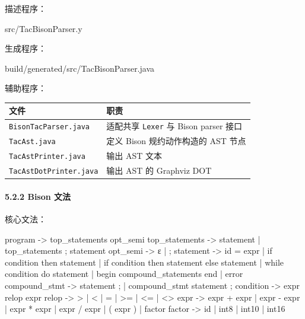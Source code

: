 \documentclass[
  a4paper,
  fontset=none,
]{ctexart}
\newenvironment{Shaded}{}{}
\newcommand{\NormalTok}[1]{#1}
\begin{document}
描述程序：

\begin{Shaded}
\begin{Highlighting}[]
\NormalTok{src/TacBisonParser.y}
\end{Highlighting}
\end{Shaded}

生成程序：

\begin{Shaded}
\begin{Highlighting}[]
\NormalTok{build/generated/src/TacBisonParser.java}
\end{Highlighting}
\end{Shaded}

辅助程序：

\begin{longtable}[]{@{}ll@{}}
\toprule\noalign{}
文件 & 职责 \\
\midrule\noalign{}
\endhead
\bottomrule\noalign{}
\endlastfoot
\texttt{BisonTacParser.java} & 适配共享 \texttt{Lexer} 与 Bison parser
接口 \\
\texttt{TacAst.java} & 定义 Bison 规约动作构造的 AST 节点 \\
\texttt{TacAstPrinter.java} & 输出 AST 文本 \\
\texttt{TacAstDotPrinter.java} & 输出 AST 的 Graphviz DOT \\
\end{longtable}

\hypertarget{bison-ux6587ux6cd5}{%
\paragraph{5.2.2 Bison 文法}\label{bison-ux6587ux6cd5}}

核心文法：

\begin{Shaded}
\begin{Highlighting}[]
\NormalTok{program          {-}\textgreater{} top\_statements opt\_semi}
\NormalTok{top\_statements   {-}\textgreater{} statement}
\NormalTok{                  | top\_statements ; statement}
\NormalTok{opt\_semi         {-}\textgreater{} ε | ;}
\NormalTok{statement        {-}\textgreater{} id = expr}
\NormalTok{                  | if condition then statement}
\NormalTok{                  | if condition then statement else statement}
\NormalTok{                  | while condition do statement}
\NormalTok{                  | begin compound\_statements end}
\NormalTok{                  | error}
\NormalTok{compound\_stmt    {-}\textgreater{} statement ;}
\NormalTok{                  | compound\_stmt statement ;}
\NormalTok{condition        {-}\textgreater{} expr relop expr}
\NormalTok{relop            {-}\textgreater{} \textgreater{} | \textless{} | = | \textgreater{}= | \textless{}= | \textless{}\textgreater{}}
\NormalTok{expr             {-}\textgreater{} expr + expr}
\NormalTok{                  | expr {-} expr}
\NormalTok{                  | expr * expr}
\NormalTok{                  | expr / expr}
\NormalTok{                  | ( expr )}
\NormalTok{                  | factor}
\NormalTok{factor           {-}\textgreater{} id | int8 | int10 | int16}
\end{Highlighting}
\end{Shaded}
\end{document}
